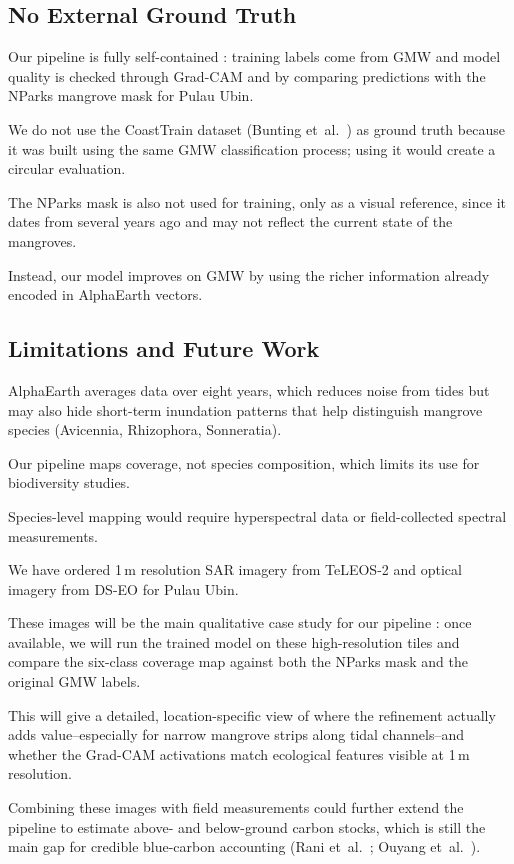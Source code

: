 \documentclass[conference,a4paper]{IEEEtran}
\begin{document}
\subsection{No External Ground Truth}

Our pipeline is fully self-contained : training labels come from GMW and model quality is checked through Grad-CAM and by comparing predictions with the NParks mangrove mask for Pulau Ubin. 

We do not use the CoastTrain dataset (Bunting et~al.~\cite{article14}) as ground truth because it was built using the same GMW classification process; using it would create a circular evaluation. 

The NParks mask is also not used for training, only as a visual reference, since it dates from several years ago and may not reflect the current state of the mangroves. 

Instead, our model improves on GMW by using the richer information already encoded in AlphaEarth vectors.

\subsection{Limitations and Future Work}

AlphaEarth averages data over eight years, 
which reduces noise from tides but may also hide short-term inundation patterns that help distinguish mangrove species (Avicennia, Rhizophora, Sonneratia). 

Our pipeline maps coverage, not species composition, which limits its use for biodiversity studies. 

Species-level mapping would require hyperspectral data or field-collected spectral measurements.

We have ordered 1\,m resolution SAR imagery from TeLEOS-2 and optical imagery from DS-EO for Pulau Ubin. 

These images will be the main qualitative case study for our pipeline : once available, we will run the trained model on these high-resolution tiles and compare the six-class coverage map against both the NParks mask and the original GMW labels. 

This will give a detailed, location-specific view of where the refinement actually adds value--especially for narrow mangrove strips along tidal channels--and whether the Grad-CAM activations match ecological features visible at 1\,m resolution. 

Combining these images with field measurements could further extend the pipeline to estimate above- and below-ground carbon stocks, 
which is still the main gap for credible blue-carbon accounting (Rani et~al.~\cite{article40}; Ouyang et~al.~\cite{article41}).
\end{document}
